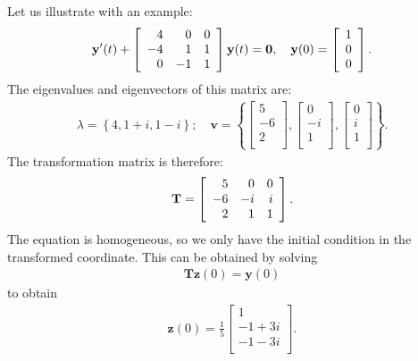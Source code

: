 Let us illustrate with an example:
\begin{align}
  \mathbf{y}'(t) + \left[ \begin{array}{r r r}
   4 &  0 &  0 \\
  -4 &  1 &  1 \\
   0 & -1 &  1 \\ \end{array} \right] \mathbf{y}(t) = \mathbf{0}, \quad 
   \mathbf{y}(0) = \left[ \begin{array}{c} 1 \\ 0 \\ 0 \\ \end{array} \right] .
\end{align}
The eigenvalues and eigenvectors of this matrix are:
\begin{align}
  \lambda = \left\{ 4, 1 + i, 1 - i \right\}; \quad
  \mathbf{v} = \left\{ 
  \left[ \begin{array}{c} 5 \\ -6 \\ 2 \\ \end{array} \right],
  \left[ \begin{array}{c} 0 \\ -i \\ 1 \\ \end{array} \right],
  \left[ \begin{array}{c} 0 \\  i \\ 1 \\ \end{array} \right] \right\}  .
\end{align}
The transformation matrix is therefore:
\begin{align}
  \mathbf{T} = \left[ \begin{array}{r r r}
   5 &  0 &  0 \\
  -6 & -i &  i \\
   2 &  1 &  1 \\ \end{array} \right] .
\end{align}
The equation is homogeneous, so we only have the initial condition in the transformed coordinate. This can be obtained by solving
\begin{align}
  \mathbf{T} \mathbf{z}(0) = \mathbf{y}(0) \nonumber
\end{align}
to obtain
\begin{align}
  \mathbf{z}(0) = \frac{1}{5} \left[ \begin{array}{c} 1 \\ -1 + 3i \\ -1 - 3i \\ \end{array} \right] .
\end{align}
